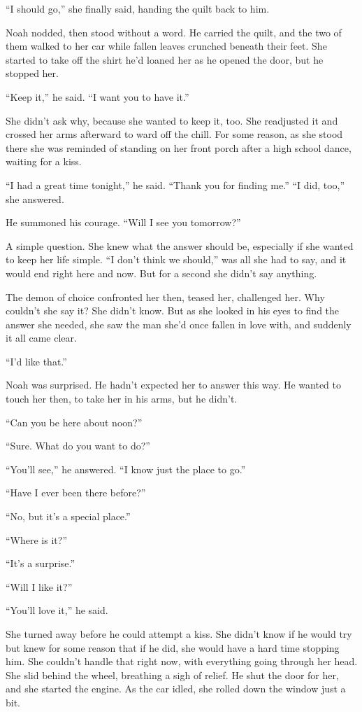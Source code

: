 \documentclass[10pt, twoside, openright]{book}
\begin{document}
``I should go,'' she finally said, handing the quilt back to him.


Noah nodded, then stood without a word. He carried the quilt, and the
two of them walked to her car while fallen leaves crunched beneath their
feet. She started to take off the shirt he'd loaned her as he opened the
door, but he stopped her.


``Keep it,'' he said. ``I want you to have it.''


She didn't ask why, because she wanted to keep it, too. She readjusted
it and crossed her arms afterward to ward off the chill. For some
reason, as she stood there she was reminded of standing on her front
porch after a high school dance, waiting for a kiss.


``I had a great time tonight,'' he said. ``Thank you for finding me.''
``I did, too,'' she answered.

He summoned his courage. ``Will I see you tomorrow?''


A simple question. She knew what the answer should be, especially if she
wanted to keep her life simple. ``I don't think we should,'' was all she
had to say, and it would end right here and now. But for a second she
didn't say anything.

The demon of choice confronted her then, teased her, challenged her. Why
couldn't she say it? She didn't know. But as she looked in his eyes to
find the answer she needed, she saw the man she'd once fallen in love
with, and suddenly it all came clear.


``I'd like that.''


Noah was surprised. He hadn't expected her to answer this way. He wanted
to touch her then, to take her in his arms, but he didn't.


``Can you be here about noon?''

``Sure. What do you want to do?''

``You'll see,'' he answered. ``I know just the place to go.''

``Have I ever been there before?''

``No, but it's a special place.''

``Where is it?''

``It's a surprise.''

``Will I like it?''

``You'll love it,'' he said.


She turned away before he could attempt a kiss. She didn't know if he
would try but knew for some reason that if he did, she would have a hard
time stopping him. She couldn't handle that right now, with everything
going through her head. She slid behind the wheel, breathing a sigh of
relief. He shut the door for her, and she started the engine. As the car
idled, she rolled down the window just a bit.
\end{document}
